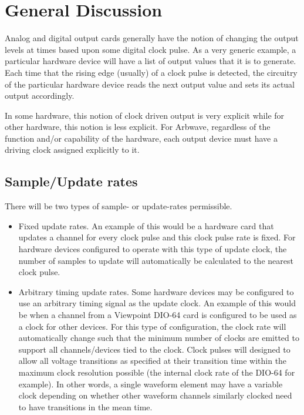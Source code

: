 \thispagestyle{fancy}
\pagestyle{fancy}

\section{General Discussion}
Analog and digital output cards generally have the notion of changing the output
levels at times based upon some digital clock pulse.  As a very generic example,
a particular hardware device will have a list of output values that it is to
generate.  Each time that the rising edge (usually) of a clock pulse is
detected, the circuitry of the particular hardware device reads the next output
value and sets its actual output accordingly.

In some hardware, this notion of clock driven output is very explicit while for
other hardware, this notion is less explicit.  For Arbwave, regardless of the
function and/or capability of the hardware, each output device must have a
driving clock assigned explicitly to it.

\subsection{Sample/Update rates}
There will be two types of sample- or update-rates permissible.
\begin{itemize}
\item  Fixed update rates.
  An example of this would be a hardware card that updates a channel for every
  clock pulse and this clock pulse rate is fixed.  For hardware devices
  configured to operate with this type of update clock, the number of samples
  to update will automatically be calculated to the nearest clock pulse.
\item  Arbitrary timing update rates.
  Some hardware devices may be configured to use an arbitrary timing signal as
  the update clock.  An example of this would be when a channel from a
  Viewpoint DIO-64 card is configured to be used as a clock for other devices.
  For this type of configuration, the clock rate will automatically change
  such that the minimum number of clocks are emitted to support all
  channels/devices tied to the clock.  Clock pulses will designed to allow
  all voltage transitions as specified at their transition time within the
  maximum clock resolution possible (the internal clock rate of the DIO-64 for
  example).  In other words, a single waveform element may have a variable
  clock depending on whether other waveform channels similarly clocked need to
  have transitions in the mean time.
\end{itemize}


